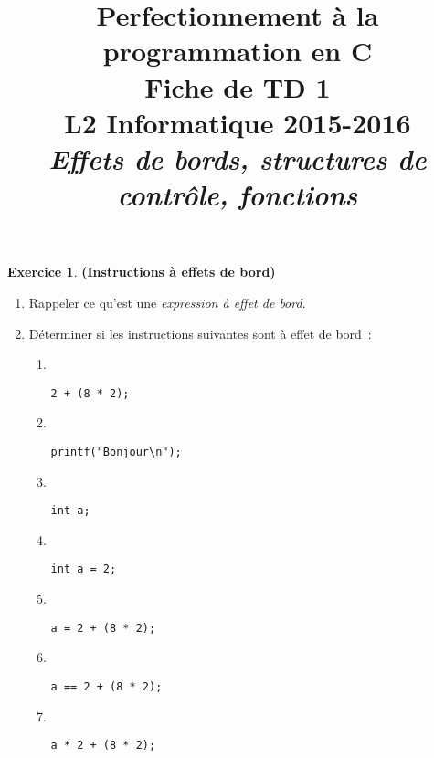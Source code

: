 \documentclass[12pt]{article}
\date{}
\title{{\bf Perfectionnement à la programmation en {\sf C}} \\
    Fiche de TD 1 \\
    {\small L2 Informatique 2015-2016} \\
    {\it \small Effets de bords, structures de contrôle, fonctions}}
\theoremstyle{definition}
\newtheorem{Exercice}{Exercice}
\begin{document}
\maketitle

\begin{Exercice} {\bf (Instructions à effets de bord)}\smallskip
\begin{enumerate}
    \item Rappeler ce qu'est une {\em expression à effet de bord}.
    \smallskip

    \item Déterminer si les instructions suivantes sont à effet de bord~:
    \begin{multicols}{2}
        \begin{enumerate}
            \item ~
\begin{lstlisting}
2 + (8 * 2);
\end{lstlisting}
            \medskip

            \item ~
\begin{lstlisting}
printf("Bonjour\n");
\end{lstlisting}
            \medskip

            \item ~
\begin{lstlisting}
int a;
\end{lstlisting}
            \medskip
            
            \item ~
\begin{lstlisting}
int a = 2;
\end{lstlisting}
            \medskip

            \item ~
\begin{lstlisting}
a = 2 + (8 * 2);
\end{lstlisting}
            \medskip

            \item ~
\begin{lstlisting}
a == 2 + (8 * 2);
\end{lstlisting}
            \medskip

            \item ~
\begin{lstlisting}
a * 2 + (8 * 2);
\end{lstlisting}
            \medskip


\end{enumerate}
\end{multicols}
\end{enumerate}
\end{Exercice}
\end{document}
